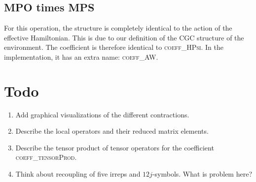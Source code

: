 \documentclass[a4paper,10pt,parskip=full]{scrartcl}
\begin{document}
\subsection{MPO times MPS}
For this operation, the structure is completely identical to the action of the effective Hamiltonian.
This is due to our definition of the CGC structure of the environment.
The coefficient is therefore identical to \textsc{coeff\_HPsi}.
In the implementation, it has an extra name: \textsc{coeff\_AW}.
\section{Todo}
\begin{enumerate}
\item Add graphical visualizations of the different contractions.
\item Describe the local operators and their reduced matrix elements.
\item Describe the tensor product of tensor operators for the coefficient \textsc{coeff\_tensorProd}.
\item Think about recoupling of five irreps and $12j$-symbols. What is problem here?
\end{enumerate}
\end{document}
